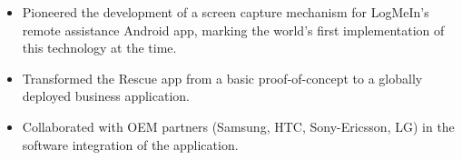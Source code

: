 \begin{itemize}
  \item Pioneered the development of a screen capture mechanism for LogMeIn's remote assistance Android app, marking the world's first implementation of this technology at the time.
  \item Transformed the Rescue app from a basic proof-of-concept to a globally deployed business application.
  \item Collaborated with OEM partners (Samsung, HTC, Sony-Ericsson, LG) in the software integration of the application.
\end{itemize}
\divider
